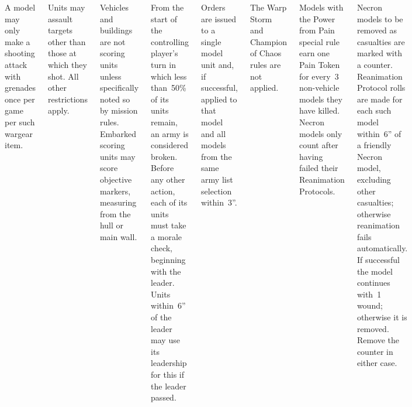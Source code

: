 \begin{columns}
 A model may only make a shooting attack
with grenades once per game per such wargear item.



  Units may assault targets other than
those at which they shot.  All other restrictions apply.


%

\vspace{-9pt}%
 Vehicles and buildings are
not scoring units unless specifically noted so by mission rules.
Embarked scoring units may score objective markers, measuring from the
hull or main wall.

  From the start of the controlling
player's turn in which less than~50\% of its units remain, an army is
considered broken.  Before any other action, each of its units must
take a morale check, beginning with the leader.  Units within~6'' of
the leader may use its leadership for this if the leader passed.

%

\vspace{-9pt}%
 Orders are issued to a single
model unit and, if successful, applied to that model and all models
from the same army list selection within~3''.

\vspace{-9pt}%
 The Warp Storm
and Champion of Chaos rules are not applied.



\vspace{-9pt}%
 Models with the Power from Pain
special rule earn one Pain Token for every~3 non-vehicle models they
have killed. Necron models only count after having failed their
Reanimation Protocols.

\vspace{-9pt}%
 Necron models to be removed as casualties
are marked with a counter.  Reanimation Protocol rolls are made for
each such model within~6'' of a friendly Necron model, excluding other
casualties; otherwise reanimation fails automatically.  If successful
the model continues with~1 wound; otherwise it is removed.  Remove the
counter in either case.

\end{columns}

